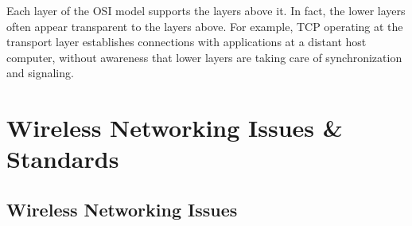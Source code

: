 Each layer of the OSI model supports the layers above it. In fact, the lower layers often appear transparent to the layers above. For example, TCP operating at the transport layer establishes connections with applications at a distant host computer, without awareness
that lower layers are taking care of synchronization and signaling. 

\section{Wireless Networking Issues \& Standards}

\subsection{Wireless Networking Issues}
\begin{multicols}{2}
%		
%		
%		
%		
%		
%		
\begin{itemize}
	

\end{itemize}
\end{multicols}
